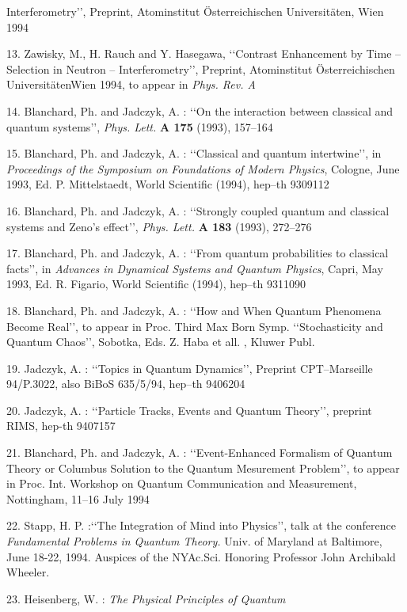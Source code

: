 \documentclass[12pt]{article}
\def\lqq{\lq\lq}
\def\rqq{\rq\rq}
\begin{document}
\begin{description}
Interferometry\rqq, Preprint, Atominstitut \"Osterreichischen
Universit\"aten, Wien 1994
\item{13.} Zawisky, M., H. Rauch and Y. Hasegawa, \lqq Contrast Enhancement
by Time -- Selection in Neutron -- Interferometry\rqq, Preprint,
Atominstitut \"Osterreichischen
Universit\"atenWien 1994, to
appear in {\sl Phys. Rev. A}
\item{14.} Blanchard,  Ph.  and Jadczyk,  A. : \lqq On the interaction
between classical and quantum systems\rqq, {\sl Phys. Lett. }{\bf A
175} (1993), 157--164
\item{15.}  Blanchard,  Ph.  and Jadczyk,  A. : \lqq Classical and quantum
intertwine\rqq,  in {\sl Proceedings of the Symposium on Foundations of
Modern Physics},  Cologne,  June 1993,  Ed.  P.  Mittelstaedt,  World
Scientific  (1994),  hep--th 9309112
\item{16.} Blanchard,  Ph.  and Jadczyk,  A. : \lqq Strongly coupled
quantum and classical systems and Zeno's effect\rqq, {\sl
Phys. Lett. }{\bf A 183} (1993), 272--276
\item{17.}  Blanchard,  Ph.  and Jadczyk,  A. : \lqq From quantum
probabilities to classical facts\rqq,  in {\sl Advances in Dynamical
Systems and Quantum Physics},  Capri,  May 1993,  Ed.  R.  Figario,  World
Scientific  (1994), hep--th 9311090
\item{18.} Blanchard,  Ph.  and Jadczyk,  A. :  \lqq How and
When Quantum Phenomena Become Real\rqq,  to appear in Proc.
Third Max Born Symp.  \lqq Stochasticity and Quantum Chaos\rqq,
Sobotka,  Eds.  Z.  Haba et all. ,  Kluwer Publ.
\item{19.}  Jadczyk, A. : \lqq Topics in Quantum Dynamics\rqq, Preprint
CPT--Marseille 94/P.3022, also BiBoS 635/5/94, hep--th 9406204
\item{20.}  Jadczyk, A. : \lqq Particle Tracks, Events and Quantum
Theory\rqq,  preprint RIMS, hep-th 9407157
\item{21.} Blanchard, Ph. and Jadczyk, A. : \lqq Event-Enhanced Formalism of
Quantum Theory or Columbus Solution to the Quantum Mesurement Problem\rqq,
to appear in Proc. Int. Workshop on  Quantum Communication
and Measurement, Nottingham, 11--16 July 1994
\item{22.} Stapp, H. P. :\lqq The Integration of Mind into Physics\rqq,
talk at
the conference {\sl Fundamental Problems in Quantum Theory.} Univ. of
Maryland at Baltimore, June 18-22, 1994. Auspices of the NYAc.Sci.
Honoring Professor John Archibald Wheeler.
\item{23.} Heisenberg, W. : {\sl The Physical Principles of Quantum
}
\end{description}
\end{document}
